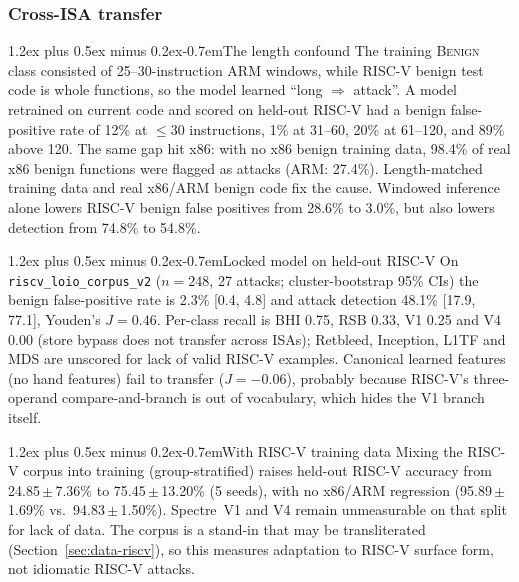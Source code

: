 \documentclass[conference]{IEEEtran}
\makeatletter
\renewcommand\paragraph{\@startsection{paragraph}{4}{\z@}%
  {1.2ex plus 0.5ex minus 0.2ex}{-0.7em}{\normalfont\normalsize\bfseries}}
\newcommand{\cls}[1]{\textsc{#1}}
\makeatother
\begin{document}
\subsubsection{Cross-ISA transfer}
\label{sec:xisa}
\paragraph{The length confound}
The training \cls{Benign} class consisted of 25--30-instruction ARM windows,
while RISC-V benign test code is whole functions, so the model learned ``long
$\Rightarrow$ attack''. A model retrained on current code and scored on
held-out RISC-V had a benign false-positive rate of 12\% at $\le$30
instructions, 1\% at 31--60, 20\% at 61--120, and 89\% above 120.
The same gap hit x86: with no x86 benign training data, 98.4\% of real x86
benign functions were flagged as attacks (ARM: 27.4\%). Length-matched
training data and real x86/ARM benign code fix the cause. Windowed inference
alone lowers RISC-V benign false positives from 28.6\% to 3.0\%, but also
lowers detection from 74.8\% to 54.8\%.

\paragraph{Locked model on held-out RISC-V}
On \texttt{riscv\_loio\_corpus\_v2} ($n=248$, 27 attacks; cluster-bootstrap
95\% CIs) the benign false-positive rate is 2.3\% [0.4, 4.8] and attack
detection 48.1\% [17.9, 77.1], Youden's $J=0.46$. Per-class recall is BHI 0.75,
RSB 0.33, V1 0.25 and V4 0.00 (store bypass does not transfer across ISAs);
Retbleed, Inception, L1TF and MDS are unscored for lack of valid RISC-V
examples.
Canonical learned features (no hand features) fail to transfer ($J=-0.06$),
probably because RISC-V's three-operand compare-and-branch is out of
vocabulary, which hides the V1 branch itself.

\paragraph{With RISC-V training data}
Mixing the RISC-V corpus into training (group-stratified) raises held-out
RISC-V accuracy from 24.85\,$\pm$\,7.36\% to 75.45\,$\pm$\,13.20\% (5 seeds),
with no x86/ARM regression (95.89\,$\pm$\,1.69\% vs.\ 94.83\,$\pm$\,1.50\%).
Spectre~V1 and V4 remain unmeasurable on that split for lack of data. The
corpus is a stand-in that may be transliterated (Section~\ref{sec:data-riscv}), so this measures
adaptation to RISC-V surface form, not idiomatic RISC-V attacks.
\end{document}
